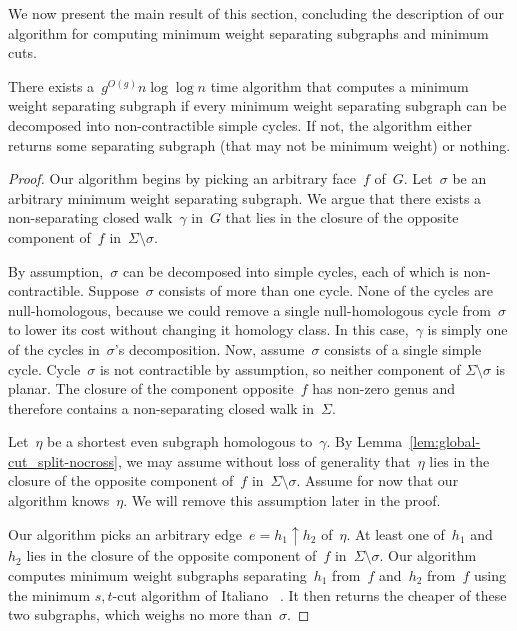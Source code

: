 We now present the main result of this section, concluding the description of our algorithm for computing minimum weight separating subgraphs and minimum cuts.
\begin{lemma}
  \label{lem:global-cut_split-alg}
  There exists a~$g^{O(g)} n \log \log n$ time algorithm that computes a minimum weight separating subgraph if every minimum weight separating subgraph can be decomposed into non-contractible simple cycles. If not, the algorithm either returns some separating subgraph (that may not be minimum weight) or nothing.
\end{lemma}
\begin{proof}
Our algorithm begins by picking an arbitrary face~$f$ of~$G$. Let~$\sigma$ be an arbitrary minimum weight separating subgraph.
We argue that there exists a non-separating closed walk~$\gamma$ in~$G$ that lies in the closure of the opposite component of~$f$ in~$\Sigma \setminus \sigma$.

By assumption,~$\sigma$ can be decomposed into simple cycles, each of which is non-contractible. Suppose~$\sigma$ consists of more than one cycle. None of the cycles are null-homologous, because we could remove a single null-homologous cycle from~$\sigma$ to lower its cost without changing it homology class.
In this case,~$\gamma$ is simply one of the cycles in~$\sigma$'s decomposition. Now, assume~$\sigma$ consists of a single simple cycle. Cycle~$\sigma$ is not contractible by assumption, so neither component of $\Sigma \setminus \sigma$ is planar. The closure of the component opposite~$f$ has non-zero genus and therefore contains a non-separating closed walk in~$\Sigma$.

Let~$\eta$ be a shortest even subgraph homologous to~$\gamma$.
By Lemma~\ref{lem:global-cut_split-nocross}, we may assume without loss of generality that~$\eta$ lies in the closure of the opposite component of~$f$ in~$\Sigma \setminus \sigma$. Assume for now that our algorithm knows~$\eta$. We will remove this assumption later in the proof.

Our algorithm picks an arbitrary edge~$e = h_1 \uparrow h_2$ of~$\eta$. At least one of~$h_1$ and~$h_2$ lies in the closure of the opposite component of~$f$ in~$\Sigma \setminus \sigma$. Our algorithm computes minimum weight subgraphs separating~$h_1$ from~$f$ and~$h_2$ from~$f$ using the minimum $s,t$-cut algorithm of Italiano \etal~\cite{insw-iamcmf-11}. It then returns the cheaper of these two subgraphs, which weighs no more than~$\sigma$.


\end{proof}
